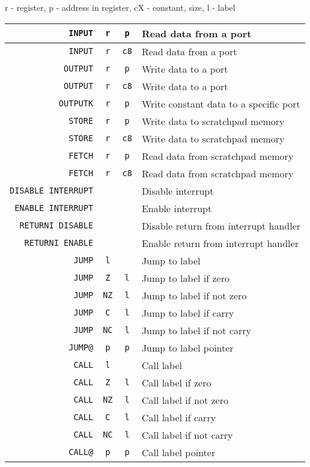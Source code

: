 \begin{table}[H]
\centering
r - register, p - address in register, cX - constant, size, l - label
\begin{tabular}{| r | c | c | l |}\hline
\verb|INPUT|&\verb|r|&\verb|p|& Read data from a port \\ \hline
\verb|INPUT|&\verb|r|&\verb|c8|& Read data from a port \\ \hline
\verb|OUTPUT|&\verb|r|&\verb|p|& Write data to a port \\ \hline
\verb|OUTPUT|&\verb|r|&\verb|c8|& Write data to a port \\ \hline
\verb|OUTPUTK|&\verb|r|&\verb|p|& Write constant data to a specific port\\ \hline

\verb|STORE|&\verb|r|&\verb|p|& Write data to scratchpad memory \\ \hline
\verb|STORE|&\verb|r|&\verb|c8|& Write data to scratchpad memory \\ \hline
\verb|FETCH|&\verb|r|&\verb|p|& Read data from scratchpad memory \\ \hline
\verb|FETCH|&\verb|r|&\verb|c8|& Read data from scratchpad memory \\ \hline

\verb|DISABLE INTERRUPT|&\verb||&\verb||& Disable interrupt \\ \hline
\verb|ENABLE INTERRUPT|&\verb||&\verb||& Enable interrupt \\ \hline
\verb|RETURNI DISABLE|&\verb||&\verb||& Disable return from interrupt handler \\ \hline
\verb|RETURNI ENABLE|&\verb||&\verb||& Enable return from interrupt handler \\ \hline

\verb|JUMP|&\verb|l|&\verb||& Jump to label \\ \hline
\verb|JUMP|&\verb|Z|&\verb|l|& Jump to label if zero \\ \hline
\verb|JUMP|&\verb|NZ|&\verb|l|& Jump to label if not zero \\ \hline
\verb|JUMP|&\verb|C|&\verb|l|& Jump to label if carry \\ \hline
\verb|JUMP|&\verb|NC|&\verb|l|& Jump to label if not carry \\ \hline
\verb|JUMP@|&\verb|p|&\verb|p|& Jump to label pointer\\ \hline

\verb|CALL|&\verb|l|&\verb||& Call label \\ \hline
\verb|CALL|&\verb|Z|&\verb|l|& Call label if zero \\ \hline
\verb|CALL|&\verb|NZ|&\verb|l|& Call label if not zero \\ \hline
\verb|CALL|&\verb|C|&\verb|l|& Call label if carry \\ \hline
\verb|CALL|&\verb|NC|&\verb|l|& Call label if not carry \\ \hline
\verb|CALL@|&\verb|p|&\verb|p|& Call label pointer \\ \hline


\end{tabular}
\end{table}
